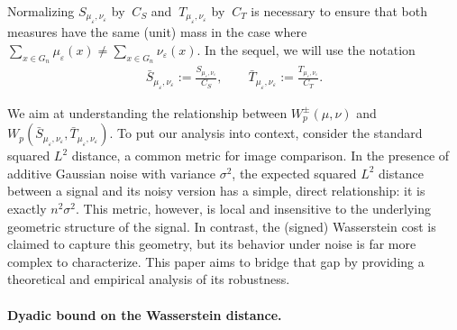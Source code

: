\documentclass{article}
\theoremstyle{plain}
\theoremstyle{definition}
\theoremstyle{remark}
\begin{document}
Normalizing $S_{\mu_\varepsilon, \nu_\varepsilon}$ by $\ C_S$ and $\ T_{\mu_\varepsilon, \nu_\varepsilon}$ by $\ C_T$ is necessary to ensure that both measures have the same (unit) mass in the case where $\sum_{x \in G_n} \mu_\varepsilon(x) \neq \sum_{x \in G_n} \nu_\varepsilon(x)$. In the sequel, we will use the notation 
\begin{align}
    \label{eq: MeasSwitchResc}
    \bar{S}_{\mu_\varepsilon, \nu_\varepsilon}
    :=
    \frac{S_{\mu_\varepsilon, \nu_\varepsilon}}{C_S},
    \qquad
    \bar T_{\mu_\varepsilon, \nu_\varepsilon}
    :=
    \frac{T_{\mu_\varepsilon, \nu_\varepsilon}}{C_T}.
\end{align}

We aim at understanding the relationship between $W^\pm_p (\mu, \nu) $ and $ W_p ( \bar S_{\mu_\varepsilon, \nu_\varepsilon}, \bar T_{\mu_\varepsilon, \nu_\varepsilon})$.
To put our analysis into context, consider the standard squared $L^2$ distance, a common metric for image comparison. In the presence of additive Gaussian noise with variance $\sigma^2$, the expected squared $L^2$ distance between a signal and its noisy version has a simple, direct relationship: it is exactly $n^2\sigma^2$. This metric, however, is local and insensitive to the underlying geometric structure of the signal. In contrast, the (signed) Wasserstein cost is claimed to capture this geometry, but its behavior under noise is far more complex to characterize. This paper aims to bridge that gap by providing a theoretical and empirical analysis of its robustness.

\paragraph{Dyadic bound on the Wasserstein distance.}
\end{document}
